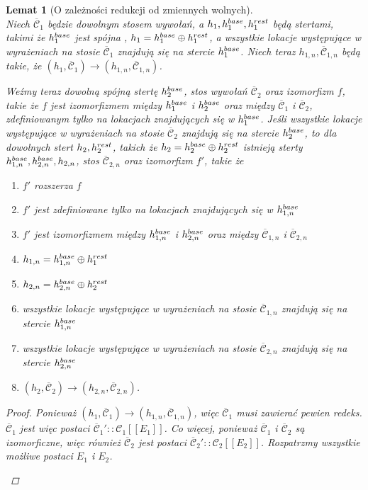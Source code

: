 \documentclass[]{pracamgr}
\renewcommand \| {\hspace{0.75em} | \hspace{0.75em} }
\renewcommand \[ {[\![}
\renewcommand \] {]\!]}
\newtheorem{lemma}{Lemat}
\theoremstyle{definition}
\newcommand{\ctxt}{\mathcal{C}\xspace}
\newcommand{\ctxts}{\overline{\ctxt}}
\begin{document}
\begin{lemma}[O zależności redukcji od zmiennych wolnych]{\ } \\
Niech $\ctxts_1$ będzie dowolnym stosem wywołań, a $h_1, h^{base}_1, h^{rest}_1$ będą stertami,
takimi że $h^{base}_1$ jest spójna , $h_1 = h^{base}_1 \oplus h^{rest}_1$,
a wszystkie lokacje występujące w wyrażeniach na stosie $\ctxts_1$ znajdują się na stercie $h^{base}_1$.
Niech teraz $h_{1, n}, \ctxts_{1, n}$ będą takie, że $(h_1, \ctxts_1) \rightarrow (h_{1, n}, \ctxts_{1, n})$.

Weźmy teraz dowolną spójną stertę $h^{base}_2$, stos wywołań $\ctxts_2$ oraz izomorfizm $f$,
takie że $f$ jest izomorfizmem między $h^{base}_1$ i $h^{base}_2$ oraz między $\ctxts_1$ i $\ctxts_2$,
zdefiniowanym tylko na lokacjach znajdujących się w $h^{base}_1$.
Jeśli wszystkie lokacje występujące w wyrażeniach na stosie $\ctxts_2$
znajdują się na stercie $h^{base}_2$, to dla dowolnych stert $h_2, h^{rest}_2$, takich że $h_2 = h^{base}_2 \oplus h^{rest}_2$
istnieją sterty $h^{base}_{1, n}, h^{base}_{2, n}, h_{2, n}$, stos $\ctxts_{2, n}$ oraz izomorfizm $f'$, takie że
\begin{enumerate}
 \item $f'$ rozszerza $f$
 \item $f'$ jest zdefiniowane tylko na lokacjach znajdujących się w $h^{base}_{1, n}$
 \item $f'$ jest izomorfizmem między $h^{base}_{1,n}$ i $h^{base}_{2,n}$ oraz między $\ctxts_{1,n}$ i $\ctxts_{2,n}$
 \item $h_{1, n} = h^{base}_{1, n} \oplus h^{rest}_1$
 \item $h_{2, n} = h^{base}_{2, n} \oplus h^{rest}_2$
 \item wszystkie lokacje występujące w wyrażeniach na stosie $\ctxts_{1, n}$ znajdują się na stercie $h^{base}_{1, n}$
 \item wszystkie lokacje występujące w wyrażeniach na stosie $\ctxts_{2, n}$ znajdują się na stercie $h^{base}_{2, n}$
 \item $(h_2, \ctxts_2) \rightarrow (h_{2, n}, \ctxts_{2, n})$.
\end{enumerate}
\begin{proof}
Ponieważ $(h_1, \ctxts_1) \rightarrow (h_{1, n}, \ctxts_{1, n})$, więc $\ctxts_1$ musi zawierać pewien redeks.
$\ctxts_1$ jest więc postaci $\ctxts_1'::\ctxt_1 \[ E_1 \]$.
Co więcej, ponieważ $\ctxts_1$ i $\ctxts_2$ są izomorficzne,
więc również $\ctxts_2$ jest postaci $\ctxts_2'::\ctxt_2 \[ E_2 \]$.
Rozpatrzmy wszystkie możliwe postaci $E_1$ i $E_2$.
\begin{itemize}

\end{itemize}
\end{proof}
\end{lemma}
\end{document}
